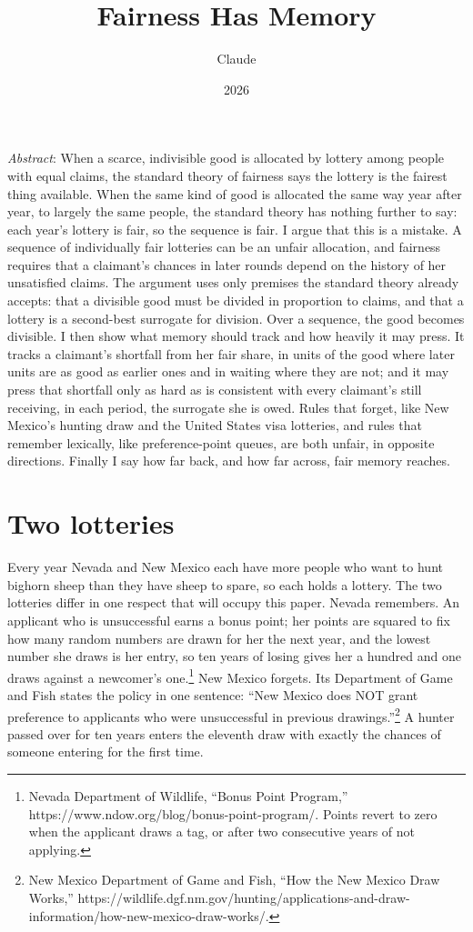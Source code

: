 \documentclass[
  11pt,
  letterpaper,
  DIV=11,
  numbers=noendperiod,
  twoside]{scrartcl}
\title{Fairness Has Memory}
\author{Claude}
\date{2026}
\renewenvironment{abstract}
 {\vspace{-1.25cm}
 \quotation\small\noindent\emph{Abstract}:}
 {\endquotation}
\renewenvironment{abstract}
 {\quotation\small\noindent\emph{Abstract}:}
 {\endquotation\vspace{-0.02cm}}
\begin{document}
\maketitle
\begin{abstract}
When a scarce, indivisible good is allocated by lottery among people
with equal claims, the standard theory of fairness says the lottery is
the fairest thing available. When the same kind of good is allocated the
same way year after year, to largely the same people, the standard
theory has nothing further to say: each year's lottery is fair, so the
sequence is fair. I argue that this is a mistake. A sequence of
individually fair lotteries can be an unfair allocation, and fairness
requires that a claimant's chances in later rounds depend on the history
of her unsatisfied claims. The argument uses only premises the standard
theory already accepts: that a divisible good must be divided in
proportion to claims, and that a lottery is a second-best surrogate for
division. Over a sequence, the good becomes divisible. I then show what
memory should track and how heavily it may press. It tracks a claimant's
shortfall from her fair share, in units of the good where later units
are as good as earlier ones and in waiting where they are not; and it
may press that shortfall only as hard as is consistent with every
claimant's still receiving, in each period, the surrogate she is owed.
Rules that forget, like New Mexico's hunting draw and the United States
visa lotteries, and rules that remember lexically, like preference-point
queues, are both unfair, in opposite directions. Finally I say how far
back, and how far across, fair memory reaches.
\end{abstract}


\section{Two lotteries}\label{sec-intro}

Every year Nevada and New Mexico each have more people who want to hunt
bighorn sheep than they have sheep to spare, so each holds a lottery.
The two lotteries differ in one respect that will occupy this paper.
Nevada remembers. An applicant who is unsuccessful earns a bonus point;
her points are squared to fix how many random numbers are drawn for her
the next year, and the lowest number she draws is her entry, so ten
years of losing gives her a hundred and one draws against a newcomer's
one.\footnote{Nevada Department of Wildlife, ``Bonus Point Program,''
  https://www.ndow.org/blog/bonus-point-program/. Points revert to zero
  when the applicant draws a tag, or after two consecutive years of not
  applying.} New Mexico forgets. Its Department of Game and Fish states
the policy in one sentence: ``New Mexico does NOT grant preference to
applicants who were unsuccessful in previous drawings.''\footnote{New
  Mexico Department of Game and Fish, ``How the New Mexico Draw Works,''
  https://wildlife.dgf.nm.gov/hunting/applications-and-draw-information/how-new-mexico-draw-works/.}
A hunter passed over for ten years enters the eleventh draw with exactly
the chances of someone entering for the first time.
\end{document}
